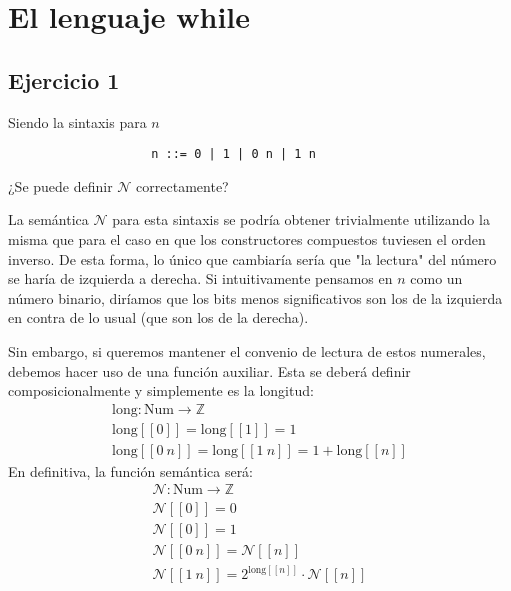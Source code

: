 \chapter{El lenguaje while}
\section{Ejercicio 1}
\begin{enun}
    Siendo la sintaxis para $n$
    \begin{lstlisting}
                    n ::= 0 | 1 | 0 n | 1 n
    \end{lstlisting} 
    ¿Se puede definir $\mathcal{N}$ correctamente?
\end{enun}
\begin{sol}
    La semántica $\mathcal{N}$ para esta sintaxis se podría obtener trivialmente
    utilizando la misma que para el caso en que los constructores compuestos
    tuviesen el orden inverso. De esta forma, lo único que cambiaría sería que
    "la lectura" del número se haría de izquierda a derecha. Si intuitivamente
    pensamos en $n$ como un número binario, diríamos que los bits menos
    significativos son los de la izquierda en contra de lo usual (que son los de
    la derecha).

    Sin embargo, si queremos mantener el convenio de lectura de estos numerales,
    debemos hacer uso de una función auxiliar. Esta se deberá definir
    composicionalmente y simplemente es la longitud:
    \begin{gather*}
        \mathrm{long}: \mathrm{Num} \rightarrow \mathbb{Z}\\
        \mathrm{long}[[0]] = \mathrm{long}[[1]] = 1\\
        \mathrm{long}[[0\ n]] = \mathrm{long}[[1\ n]] = 1 + \mathrm{long}[[n]]
    \end{gather*}
    En definitiva, la función semántica será:
    \begin{gather*}
        \mathcal{N}: \mathrm{Num} \rightarrow \mathbb{Z}\\
        \mathcal{N}[[0]] = 0\\
        \mathcal{N}[[0]] = 1\\
        \mathcal{N}[[0\ n]] = \mathcal{N}[[n]]\\
        \mathcal{N}[[1\ n]] = 2^{\mathrm{long}[[n]]} \cdot \mathcal{N}[[n]]
    \end{gather*}
\end{sol}
